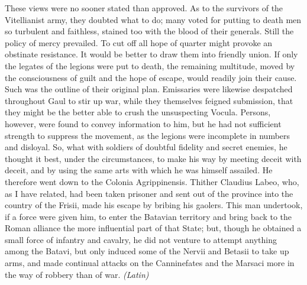 
These views were no sooner stated than approved. As to the survivors of the Vitellianist army, they doubted what to do; many voted for putting to death men so turbulent and faithless, stained too with the blood of their generals. Still the policy of mercy prevailed. To cut off all hope of quarter might provoke an obstinate resistance. It would be better to draw them into friendly union. If only the legates of the legions were put to death, the remaining multitude, moved by the consciousness of guilt and the hope of escape, would readily join their cause. Such was the outline of their original plan. Emissaries were likewise despatched throughout Gaul to stir up war, while they themselves feigned submission, that they might be the better able to crush the unsuspecting Vocula. Persons, however, were found to convey information to him, but he had not sufficient strength to suppress the movement, as the legions were incomplete in numbers and disloyal. So, what with soldiers of doubtful fidelity and secret enemies, he thought it best, under the circumstances, to make his way by meeting deceit with deceit, and by using the same arts with which he was himself assailed. He therefore went down to the Colonia Agrippinensis. Thither Claudius Labeo, who, as I have related, had been taken prisoner and sent out of the province into the country of the Frisii, made his escape by bribing his gaolers. This man undertook, if a force were given him, to enter the Batavian territory and bring back to the Roman alliance the more influential part of that State; but, though he obtained a small force of infantry and cavalry, he did not venture to attempt anything among the Batavi, but only induced some of the Nervii and Betasii to take up arms, and made continual attacks on the Canninefates and the Marsaci more in the way of robbery than of war. \emph{(Latin)}


